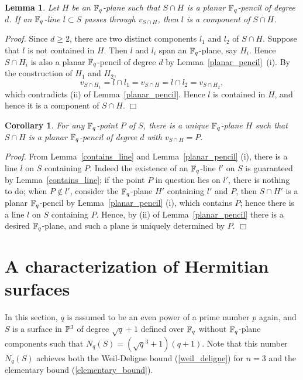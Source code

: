 \documentclass[a4paper,11pt]{article}
\newtheorem{lemma}[theorem]{Lemma}
\newtheorem{corollary}[theorem]{Corollary}
\newcommand{\proof}{\noindent \mbox{\em Proof.\hspace*{2mm}}}
\newcommand{\qed}{\hfill \mbox{$  \Box $}}
\begin{document}
\begin{lemma}
Let $H$ be an ${\Bbb F}_q$-plane
such that $S \cap H$ is a planar ${\Bbb F}_q$-pencil of degree $d$.
If an ${\Bbb F}_q$-line $l \subset S$ passes through $v_{S\cap H}$,
then $l$ is a component of $S \cap H$.
\end{lemma}
\proof
Since $d \geq 2$,
there are two distinct components $l_1$ and $l_2$ of $S \cap H$.
Suppose that $l$ is not contained in $H$.
Then  $l$ and $l_i$ span an ${\Bbb F}_q$-plane, say $H_i$.
Hence $S\cap H_i$ is also a planar ${\Bbb F}_q$-pencil of degree $d$
by Lemma~\ref{planar_pencil}~(i).
By the construction of $H_1$ and $H_2$,
\[
v_{S \cap H_1} = l \cap l_1 = v_{S \cap H} = l \cap l_2 = v_{S \cap H_2},
\]
which contradicts (ii) of Lemma~\ref{planar_pencil}.
Hence $l$ is contained in $H$, and hence it is a component of $S\cap H$.
\qed
%
\begin{corollary}\label{bijective_pencil_point}
For any ${\Bbb F}_q$-point $P$ of $S$,
there is a unique ${\Bbb F}_q$-plane $H$
such that $S\cap H$ is a planar ${\Bbb F}_q$-pencil
of degree $d$ with $v_{S\cap H} =P$.
\end{corollary}
\proof
From Lemma~\ref{contains_line} and Lemma~\ref{planar_pencil} (i),
there is a line $l$ on $S$ containing $P$.
Indeed the existence of an ${\Bbb F}_q$-line $l'$ on $S$
is guaranteed by Lemma~\ref{contains_line};
if the point $P$ in question lies on $l'$, there is nothing to do;
when $P \not\in l'$,
consider the ${\Bbb F}_q$-plane $H'$ containing $l'$ and $P$,
then $S \cap H'$ is a planar ${\Bbb F}_q$-pencil
by Lemma~\ref{planar_pencil} (i), which contains $P$;
hence there is a line $l$ on $S$ containing $P$.
Hence, by (ii) of Lemma~\ref{planar_pencil}
there is a desired ${\Bbb F}_q$-plane,
and such a plane is uniquely determined by $P$.
\qed


\section{A characterization of Hermitian surfaces}
In this section,
$q$ is assumed to be an even power of a prime number $p$ again,
and $S$ is a surface in ${\Bbb P}^3$ of degree $\sqrt{q}+1$
defined over ${\Bbb F}_q$ without ${\Bbb F}_q$-plane
components such that $N_q(S) = (\sqrt{q}^{3}+1)(q+1)$.
Note that this number $N_q(S)$
achieves both the Weil-Deligne bound (\ref{weil_deligne})
for $n=3$ and the elementary bound (\ref{elementary_bound}).
\end{document}
